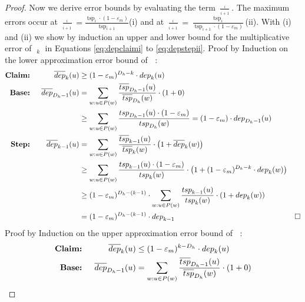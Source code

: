 \documentclass[11pt]{article}
\newcommand{\tsp}{\mathop{tsp}}
\newcommand{\tspapp}{\mathop{\overline{tsp}}}
\newcommand{\dep}{\mathop{dep}}
\newcommand{\depapp}{\mathop{\overline{dep}}}
\renewcommand{\epsilon}{\varepsilon}
\begin{document}
\begin{proof}
Now we derive error bounds by evaluating the term $\frac{\tspapp_i}{\tspapp_{i+1}}$. The maximum errors occur at $\frac{\tspapp_i}{\tspapp_{i+1}}=\frac{\tsp_i\cdot(1-\epsilon_m)}{\tsp_{i+1}}$(i) and at $\frac{\tspapp_i}{\tspapp_{i+1}}=\frac{\tsp_i}{\tsp_{i+1}\cdot(1-\epsilon_m)}$(ii).
With (i) and (ii) we show by induction an upper and lower bound for the multiplicative error of $\depapp_k$ in Equations \eqref{eq:depclaimi} to \eqref{eq:depstepii}.
\newline\newline
Proof by Induction on the lower approximation error bound of $\depapp$:
\begin{align}
\textbf{Claim: }&&
\depapp\nolimits_k(u)&\geq(1-\epsilon_m)^{D_h-k}\cdot\dep\nolimits_k(u) \label{eq:depclaimi}  \allowdisplaybreaks[4] \\
\textbf{Base: }&&
\depapp\nolimits_{D_h-1}(u)&=\sum_{w:u\in P(w)}\frac{\tspapp\nolimits_{D_h-1}(u)}{\tspapp\nolimits_{D_h}(w)}\cdot\left(1+0\right)\nonumber\\
&& &\geq\sum_{w:u\in P(w)}\frac{\tsp\nolimits_{D_h-1}(u)\cdot(1-\varepsilon_m)}{\tsp\nolimits_{D_h}(w)}=(1-\varepsilon_m)\cdot\dep\nolimits_{D_h-1}(u) \label{eq:depbasei}  \allowdisplaybreaks[4] \\
\textbf{Step: }&&
\depapp\nolimits_{k-1}(u)&=\sum_{w:u\in P(w)}\frac{\tspapp\nolimits_{k-1}(u)}{\tspapp\nolimits_{k}(w)}\cdot\left(1+\depapp\nolimits_{k}(w)\right)\nonumber\\
&& &\geq\sum_{w:u\in P(w)}\frac{\tsp\nolimits_{k-1}(u)\cdot(1-\epsilon_m)}{\tsp\nolimits_{k}(w)}\cdot\left(1+(1-\epsilon_m)^{D_h-k}\cdot\dep\nolimits_k(w)\right)\nonumber\\
&& &\geq(1-\epsilon_m)^{D_h-(k-1)}\cdot\sum_{w:u\in P(w)}\frac{\tsp\nolimits_{k-1}(u)}{\tsp\nolimits_{k}(w)}\cdot\left(1+\dep\nolimits_k(w)\right)\nonumber\\
&& &=(1-\epsilon_m)^{D_h-(k-1)}\cdot\dep\nolimits_{k-1} & \square \label{eq:depstepi}
\end{align}
\newline
Proof by Induction on the upper approximation error bound of $\depapp$:
\begin{align}
\textbf{Claim: }&&
\depapp\nolimits_k(u)&\leq(1-\epsilon_m)^{k-D_h}\cdot\dep\nolimits_k(u)\label{eq:depclaimii} \allowdisplaybreaks[4] \\
\textbf{Base: }&&
\depapp\nolimits_{D_h-1}(u)&=\sum_{w:u\in P(w)}\frac{\tspapp\nolimits_{D_h-1}(u)}{\tspapp\nolimits_{D_h}(w)}\cdot\left(1+0\right)\nonumber\\

\end{align}
\end{proof}
\end{document}
